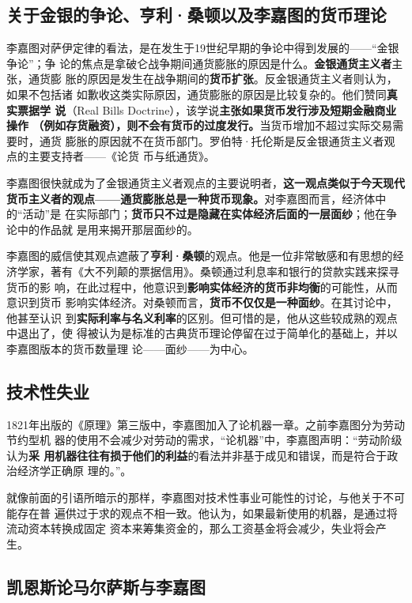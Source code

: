 \subsection{关于金银的争论、亨利·桑顿以及李嘉图的货币理论}

李嘉图对萨伊定律的看法，是在发生于19世纪早期的争论中得到发展的——“金银争论”；争
论的焦点是拿破仑战争期间通货膨胀的原因是什么。\textbf{金银通货主义者}主张，通货膨
胀的原因是发生在战争期间的\textbf{货币扩张}。反金银通货主义者则认为，如果不包括诸
如歉收这类实际原因，通货膨胀的原因是比较复杂的。他们赞同\textbf{真实票据学
  说}（Real Bills Doctrine），该学说\textbf{主张如果货币发行涉及短期金融商业操作
  （例如存货融资），则不会有货币的过度发行。}当货币增加不超过实际交易需要时，通货
膨胀的原因就不在货币部门。罗伯特·托伦斯是反金银通货主义者观点的主要支持者——《论货
币与纸通货》。

李嘉图很快就成为了金银通货主义者观点的主要说明者，\textbf{这一观点类似于今天现代
  货币主义者的观点——通货膨胀总是一种货币现象。}对李嘉图而言，经济体中的“活动”是
在实际部门；\textbf{货币只不过是隐藏在实体经济后面的一层面纱}；他在争论中的作品就
是用来揭开那层面纱的。

李嘉图的威信使其观点遮蔽了\textbf{亨利·桑顿}的观点。他是一位非常敏感和有思想的经
济学家，著有《大不列颠的票据信用》。桑顿通过利息率和银行的贷款实践来探寻货币的影
响，在此过程中，他意识到\textbf{影响实体经济的货币非均衡}的可能性，从而意识到货币
影响实体经济。对桑顿而言，\textbf{货币不仅仅是一种面纱}。在其讨论中，他甚至认识
到\textbf{实际利率与名义利率}的区别。但可惜的是，他从这些较成熟的观点中退出了，使
得被认为是标准的古典货币理论停留在过于简单化的基础上，并以李嘉图版本的货币数量理
论——面纱——为中心。

\subsection{技术性失业}

1821年出版的《原理》第三版中，李嘉图加入了论机器一章。之前李嘉图分为劳动节约型机
器的使用不会减少对劳动的需求，“论机器”中，李嘉图声明：“劳动阶级认为\textbf{采
  用机器往往有损于他们的利益}的看法并非基于成见和错误，而是符合于政治经济学正确原
理的。”。

就像前面的引语所暗示的那样，李嘉图对技术性事业可能性的讨论，与他关于不可能存在普
遍供过于求的观点不相一致。他认为，如果最新使用的机器，是通过将流动资本转换成固定
资本来筹集资金的，那么工资基金将会减少，失业将会产生。

\subsection{凯恩斯论马尔萨斯与李嘉图}

